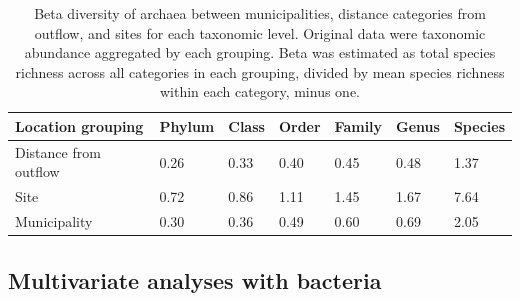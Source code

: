 \documentclass[letterpaper,12pt]{article}\usepackage[]{graphicx}\usepackage[]{color}
\begin{document}
\begin{table}[!tbp]
\caption{Beta diversity of archaea between municipalities, distance categories from outflow, and sites for each taxonomic level.  Original data were taxonomic abundance aggregated by each grouping.  Beta was estimated as total species richness across all categories in each grouping, divided by mean species richness within each category, minus one.\label{tab:beta_arch}} 
\begin{center}
\begin{tabular}{lllllll}
\hline\hline
\multicolumn{1}{l}{Location grouping}&\multicolumn{1}{c}{Phylum}&\multicolumn{1}{c}{Class}&\multicolumn{1}{c}{Order}&\multicolumn{1}{c}{Family}&\multicolumn{1}{c}{Genus}&\multicolumn{1}{c}{Species}\tabularnewline
\hline
Distance from outflow&0.26&0.33&0.40&0.45&0.48&1.37\tabularnewline
Site&0.72&0.86&1.11&1.45&1.67&7.64\tabularnewline
Municipality&0.30&0.36&0.49&0.60&0.69&2.05\tabularnewline
\hline
\end{tabular}\end{center}
\end{table}


\subsection{Multivariate analyses with bacteria}
\end{document}
